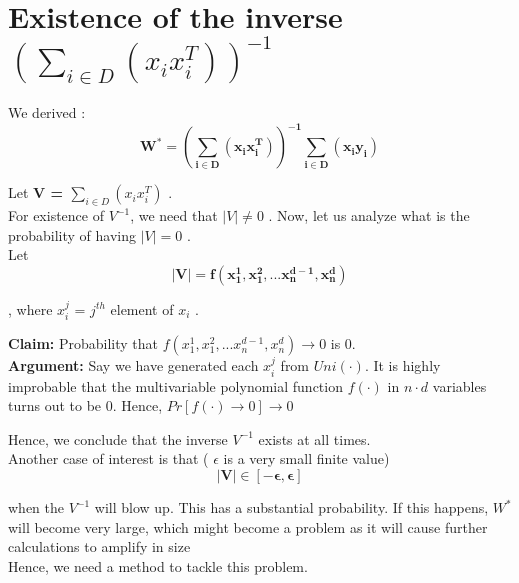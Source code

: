 \documentclass[11pt, twosides]{article}
\begin{document}
\section{Existence of the inverse $(\sum_{i \in D} (x_i x_i^T))^{-1}$}
 
We derived : 
\begin{equation}
    \mathbf{ W^* = (\sum_{i \in D} (x_i x_i^T))^{-1} \sum_{i \in D} (x_i y_i)} 
\end{equation}

Let \textbf{V = $\sum_{i \in D} (x_i x_i^T)$} .\\
For existence of $V^{-1}$, we need that \textbf{$|V| \neq 0 $ }. Now, let us analyze what is the probability of having \textbf{$|V| = 0 $ }.\\
Let
\begin{equation}
    \mathbf{|V| = f( x_1^1, x_1^2, . . . x_n^{d-1}, x_n^d) }
\end{equation}
 \begin{flushright}
 , where $x_i^j$ = $j^{th}$ element of \textbf{$x_i$}  .\\
  \end{flushright}
\textbf{Claim:} Probability that $f( x_1^1, x_1^2, . . . x_n^{d-1}, x_n^d) \rightarrow 0 $ is 0.\\

\textbf{Argument:} Say we have generated each $x_i^j$ from $Uni(\cdot)$. It is highly improbable that the multivariable polynomial function $f(\cdot)$ in $n \cdot d$ variables turns out to be 0. Hence, $Pr[ f(\cdot) \rightarrow 0] \rightarrow 0$

Hence, we conclude that the inverse $V^{-1}$ exists at all times.\\
Another case of interest is that ( $\epsilon$ is a very small finite value)
\begin{equation}
    \mathbf{ |V| \in [-\epsilon,\epsilon] }
\end{equation}

when the $V^{-1}$ will blow up. This has a substantial probability. If this happens, $W^*$ will become very large, which might become a problem as it will cause further calculations to amplify in size\\ 
Hence, we need a method to tackle this problem.
\end{document}
